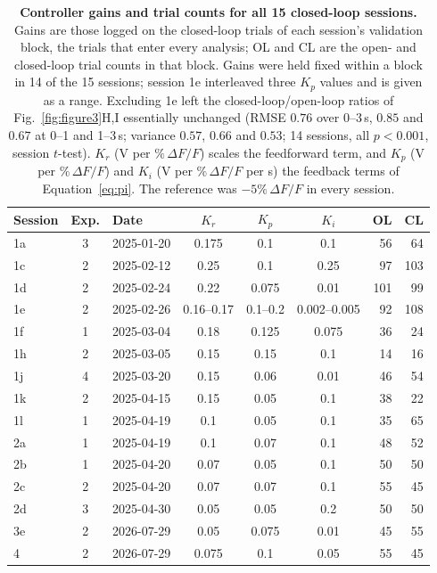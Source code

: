 \setcounter{table}{0}
\renewcommand{\thetable}{S\arabic{table}}
\begin{table}[!ht]
    \centering
    \small
    \begin{tabular}{lclcccrr}
        \hline
        Session & Exp. & Date & $K_{r}$ & $K_{p}$ & $K_{i}$ & OL & CL \\
        \hline
        1a & 3 & 2025-01-20 & 0.175 & 0.1 & 0.1 & 56 & 64 \\
        1c & 2 & 2025-02-12 & 0.25 & 0.1 & 0.25 & 97 & 103 \\
        1d & 2 & 2025-02-24 & 0.22 & 0.075 & 0.01 & 101 & 99 \\
        1e & 2 & 2025-02-26 & 0.16--0.17 & 0.1--0.2 & 0.002--0.005 & 92 & 108 \\
        1f & 1 & 2025-03-04 & 0.18 & 0.125 & 0.075 & 36 & 24 \\
        1h & 2 & 2025-03-05 & 0.15 & 0.15 & 0.1 & 14 & 16 \\
        1j & 4 & 2025-03-20 & 0.15 & 0.06 & 0.01 & 46 & 54 \\
        1k & 2 & 2025-04-15 & 0.15 & 0.05 & 0.1 & 38 & 22 \\
        1l & 1 & 2025-04-19 & 0.1 & 0.05 & 0.1 & 35 & 65 \\
        2a & 1 & 2025-04-19 & 0.1 & 0.07 & 0.1 & 48 & 52 \\
        2b & 1 & 2025-04-20 & 0.07 & 0.05 & 0.1 & 50 & 50 \\
        2c & 2 & 2025-04-20 & 0.07 & 0.07 & 0.1 & 55 & 45 \\
        2d & 3 & 2025-04-30 & 0.05 & 0.05 & 0.2 & 50 & 50 \\
        3e & 2 & 2026-07-29 & 0.05 & 0.075 & 0.01 & 45 & 55 \\
        4 & 2 & 2026-07-29 & 0.075 & 0.1 & 0.05 & 55 & 45 \\
        \hline
    \end{tabular}
    \caption{\textbf{Controller gains and trial counts for all 15 closed-loop
        sessions.} Gains are those logged on the closed-loop trials of each
        session's validation block, the trials that enter every analysis; OL and
        CL are the open- and closed-loop trial counts in that block. Gains were
        held fixed within a block in 14 of the 15 sessions; session 1e interleaved three
        $K_p$ values and is given as a range. Excluding 1e left the closed-loop/open-loop         ratios of Fig.~\ref{fig:figure3}H,I essentially unchanged (RMSE $0.76$ over 0--3\,s, $0.85$ and $0.67$ at 0--1 and 1--3\,s; variance $0.57$, $0.66$ and $0.53$; 14 sessions, all $p < 0.001$, session $t$-test). $K_r$ (V per $\%\,\Delta F/F$)
        scales the feedforward term, and $K_p$ (V per $\%\,\Delta F/F$) and $K_i$
        (V per $\%\,\Delta F/F$ per s) the feedback terms of Equation~\eqref{eq:pi}.
        The reference was $-5\%\,\Delta F/F$ in every session.}
    \label{tab:gains}
\end{table}

